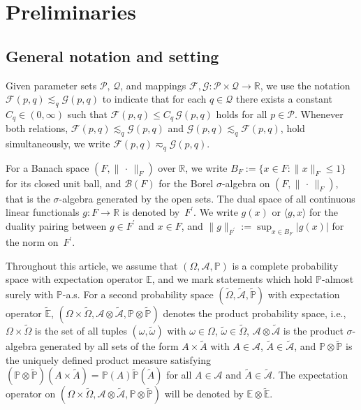 \documentclass[reqno]{amsart}
\numberwithin{equation}{section}
\newcommand{\bbE}{\mathbb{E}}
\newcommand{\bbP}{\mathbb{P}}
\newcommand{\bbR}{\mathbb{R}}
\newcommand{\cA}{\mathcal{A}}
\newcommand{\cB}{\mathcal{B}}
\newcommand{\Omegat}{\widetilde{\Omega}}
\newcommand{\omegat}{\widetilde{\omega}}
\newcommand{\cAt}{\widetilde{\cA}}
\newcommand{\bbPt}{\widetilde{\bbP}}
\newcommand{\bbEt}{\widetilde{\bbE}}
\newcommand{\norm}[2]{     \| #1       \|_{ #2 }}
\newcommand{\duality}[1]{     \langle #1       \rangle}
\newcommand{\dual}[1]{{#1}^{\prime}}
\newcommand{\from}{\colon}
\theoremstyle{remark}
\theoremstyle{definition}
\begin{document}
\section{Preliminaries}\label{section:prelim}   

\subsection{General notation and setting}\label{subsec:notation} 

Given parameter sets  
$\mathscr{P},\,\mathscr{Q}$, 
and mappings 
$\mathscr{F},\mathscr{G}\from \mathscr{P}\times\mathscr{Q}\to\bbR$, 
we use the notation  
$\mathscr{F} (p,q) \lesssim_{q} \mathscr{G} (p,q)$ 
to indicate that for each $q \in \mathscr{Q}$ 
there exists a constant ${C_q \in(0,\infty)}$ 
such that 
$\mathscr{F} (p,q) \leq C_q \, \mathscr{G} (p,q)$ 
holds 
for all ${p\in \mathscr{P}}$. 
Whenever both relations, 
$\mathscr{F} (p,q) \lesssim_q \mathscr{G}(p,q)$ 
and $\mathscr{G} (p,q) \lesssim_q \mathscr{F}(p,q)$, 
hold simultaneously, 
we write $\mathscr{F} (p,q) \eqsim_q \mathscr{G} (p,q)$.   

For a Banach space $(F,\norm{\,\cdot\,}{F})$ over $\bbR$, 
we write 
$B_F:= \{x\in F : \norm{x}{F} \leq 1 \}$ 
for its closed unit ball, 
and 
$\cB(F)$ for the Borel $\sigma$-algebra 
on 
$(F,\norm{\,\cdot\,}{F})$, 
that is the $\sigma$-algebra generated by 
the open sets. 
%
The dual space 
of all continuous linear functionals 
$g \from F \to \bbR$ 
is denoted by~$\dual{F}$\!.  
We write $g(x)$ or $\duality{g, x}$ 
for the duality pairing between $g\in \dual{F}$ 
and $x\in F$, and 
$\norm{g}{\dual{F}} := \sup_{x\in B_F} | g(x) |$ 
for the norm on~$\dual{F}$\!. 

Throughout this article, we assume that 
$(\Omega,\cA,\bbP)$ is 
a complete probability space
with expectation operator $\bbE$, 
and we mark statements which hold 
$\bbP$-almost surely with $\bbP$-a.s. 
For a second probability space 
$(\Omegat,\cAt,\bbPt)$ with expectation operator $\bbEt$, 
$(\Omega\times\Omegat,\cA\otimes\cAt,\bbP\otimes\bbPt)$ 
denotes the product probability space, i.e.,  
$\Omega\times\Omegat$ is the 
set of all tuples $(\omega,\omegat)$ with  
$\omega\in\Omega$, $\omegat\in\Omegat$, 
$\cA\otimes\cAt$ is the product $\sigma$-algebra generated by 
all sets of the form $A\times\widetilde{A}$ with $A\in\cA$, 
$\widetilde{A}\in\cAt$, 
and $\bbP\otimes\bbPt$ is the uniquely defined 
product measure satisfying 
$(\bbP\otimes\bbPt)(A\times\widetilde{A})
= 
\bbP(A)\bbPt(\widetilde{A})$ 
for all $A\in\cA$ and $\widetilde{A}\in\cAt$. 
The expectation operator on 
$(\Omega\times\Omegat,\cA\otimes\cAt,\bbP\otimes\bbPt)$ 
will be denoted by $\bbE\otimes\bbEt$. 
\end{document}
